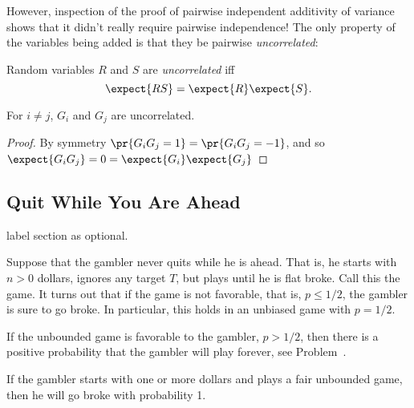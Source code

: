 However, inspection of the proof of pairwise independent additivity of
variance shows that it didn't really require pairwise independence!  The
only property of the variables being added is that they be pairwise
\emph{uncorrelated}:

\begin{definition*}
Random variables $R$ and $S$ are \emph{uncorrelated} iff
\begin{equation}\label{LN12:uncor}
\expect{RS} = \expect{R}\expect{S}.
\end{equation}
\end{definition*}

\begin{lemma}\label{LN12:Guncor}
For $i \neq j$, $G_i$ and $G_j$ are uncorrelated.
\end{lemma}

\begin{proof}
By symmetry $\pr{G_iG_j = 1} = \pr{G_iG_j = -1}$, and so
$\expect{G_iG_j} = 0 = \expect{G_i}\expect{G_j}$
\end{proof}
\fi

\subsection{Quit While You Are Ahead}

\begin{editingnotes}
label section as optional.
\end{editingnotes}

Suppose that the gambler never quits while he is ahead.  That is, he
starts with $n>0$ dollars, ignores any target $T$, but plays until he
is flat broke.  Call this the  game.
It turns out that if the game is not favorable, that is, $p \leq 1/2$,
the gambler is sure to go broke.  In particular, this holds in an
unbiased game with $p = 1/2$.

\begin{editingnotes}
If the unbounded game is favorable to the gambler, \ie $p>1/2$, then
there is a positive probability that the gambler will play forever,
see Problem~.
\end{editingnotes}

\begin{lemma}\label{LN12:go broke}
If the gambler starts with one or more dollars and plays a fair
unbounded game, then he will go broke with probability 1.
\end{lemma}

